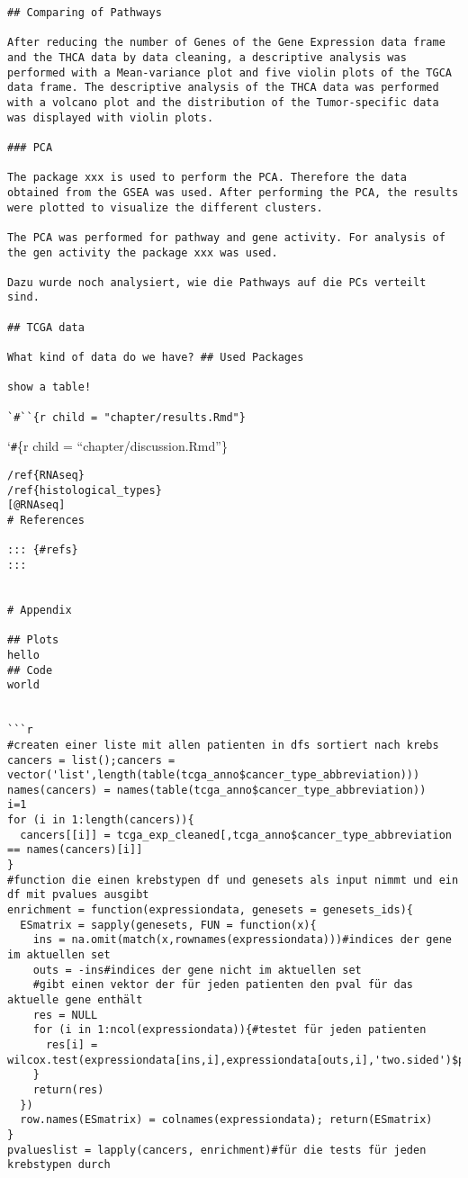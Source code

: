 \documentclass[
  parskip,
  oneside]{scrreprt}
\begin{document}
\begin{verbatim}
## Comparing of Pathways

After reducing the number of Genes of the Gene Expression data frame and the THCA data by data cleaning, a descriptive analysis was performed with a Mean-variance plot and five violin plots of the TGCA data frame. The descriptive analysis of the THCA data was performed with a volcano plot and the distribution of the Tumor-specific data was displayed with violin plots.

### PCA

The package xxx is used to perform the PCA. Therefore the data obtained from the GSEA was used. After performing the PCA, the results were plotted to visualize the different clusters.

The PCA was performed for pathway and gene activity. For analysis of the gen activity the package xxx was used.

Dazu wurde noch analysiert, wie die Pathways auf die PCs verteilt sind.

## TCGA data

What kind of data do we have? ## Used Packages

show a table!

`#``{r child = "chapter/results.Rmd"}
\end{verbatim}

`\texttt{\#}\{r child = ``chapter/discussion.Rmd''\}

\begin{verbatim}
/ref{RNAseq}
/ref{histological_types}
[@RNAseq]
# References

::: {#refs}
:::


# Appendix

## Plots
hello
## Code
world


```r
#createn einer liste mit allen patienten in dfs sortiert nach krebs
cancers = list();cancers = vector('list',length(table(tcga_anno$cancer_type_abbreviation)))
names(cancers) = names(table(tcga_anno$cancer_type_abbreviation))
i=1
for (i in 1:length(cancers)){
  cancers[[i]] = tcga_exp_cleaned[,tcga_anno$cancer_type_abbreviation == names(cancers)[i]]
}
#function die einen krebstypen df und genesets als input nimmt und ein df mit pvalues ausgibt
enrichment = function(expressiondata, genesets = genesets_ids){
  ESmatrix = sapply(genesets, FUN = function(x){
    ins = na.omit(match(x,rownames(expressiondata)))#indices der gene im aktuellen set
    outs = -ins#indices der gene nicht im aktuellen set
    #gibt einen vektor der für jeden patienten den pval für das aktuelle gene enthält
    res = NULL
    for (i in 1:ncol(expressiondata)){#testet für jeden patienten
      res[i] = wilcox.test(expressiondata[ins,i],expressiondata[outs,i],'two.sided')$p.value
    }
    return(res)
  })
  row.names(ESmatrix) = colnames(expressiondata); return(ESmatrix)
}
pvalueslist = lapply(cancers, enrichment)#für die tests für jeden krebstypen durch
\end{verbatim}
\end{document}
